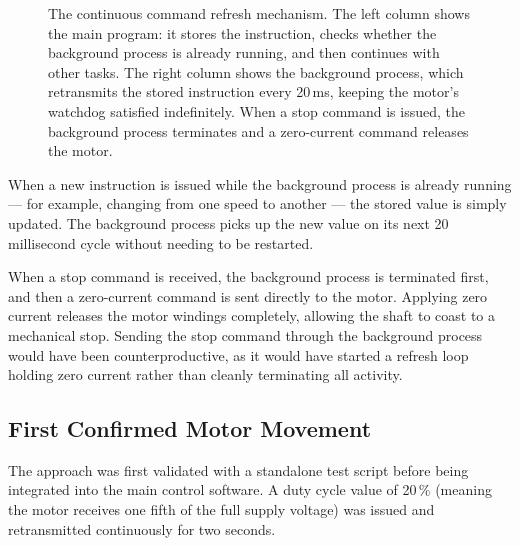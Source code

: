 \documentclass[12pt,a4paper]{article}
\begin{document}
\begin{figure}[H]
  \caption{The continuous command refresh mechanism.  The left column shows
           the main program: it stores the instruction, checks whether the
           background process is already running, and then continues with
           other tasks.  The right column shows the background process, which
           retransmits the stored instruction every 20\,ms, keeping the
           motor's watchdog satisfied indefinitely.  When a stop command is
           issued, the background process terminates and a zero-current
           command releases the motor.}
  \label{fig:refresh}
\end{figure}

When a new instruction is issued while the background process is already
running --- for example, changing from one speed to another --- the stored
value is simply updated. The background process picks up the new value on
its next 20\,millisecond cycle without needing to be restarted.

When a stop command is received, the background process is terminated
first, and then a zero-current command is sent directly to the motor.
Applying zero current releases the motor windings completely, allowing the
shaft to coast to a mechanical stop. Sending the stop command through the
background process would have been counterproductive, as it would have
started a refresh loop holding zero current rather than cleanly terminating all activity.

\subsection{First Confirmed Motor Movement}

The approach was first validated with a standalone test script before being
integrated into the main control software. A duty cycle value of 20\,\%
(meaning the motor receives one fifth of the full supply voltage) was
issued and retransmitted continuously for two seconds.
\end{document}
